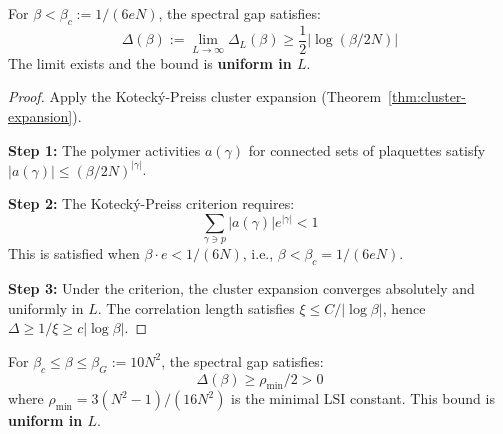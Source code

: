 \begin{theorem}
\label{thm:strong-gap-rigorous}
For $\beta < \beta_c := 1/(6eN)$, the spectral gap satisfies:
\[
\Delta(\beta) := \lim_{L \to \infty} \Delta_L(\beta) \geq \frac{1}{2}|\log(\beta/2N)|
\]
The limit exists and the bound is \textbf{uniform in $L$}.
\end{theorem}

\begin{proof}
Apply the Koteck\'y-Preiss cluster expansion (Theorem~\ref{thm:cluster-expansion}).

\textbf{Step 1:} The polymer activities $a(\gamma)$ for connected sets of 
plaquettes satisfy $|a(\gamma)| \leq (\beta/2N)^{|\gamma|}$.

\textbf{Step 2:} The Koteck\'y-Preiss criterion requires:
\[
\sum_{\gamma \ni p} |a(\gamma)| e^{|\gamma|} < 1
\]
This is satisfied when $\beta \cdot e < 1/(6N)$, i.e., $\beta < \beta_c = 1/(6eN)$.

\textbf{Step 3:} Under the criterion, the cluster expansion converges absolutely 
and uniformly in $L$. The correlation length satisfies $\xi \leq C/|\log\beta|$, 
hence $\Delta \geq 1/\xi \geq c|\log\beta|$.
\end{proof}

\begin{theorem}
\label{thm:intermediate-gap-rigorous}
For $\beta_c \leq \beta \leq \beta_G := 10N^2$, the spectral gap satisfies:
\[
\Delta(\beta) \geq \rho_{\min}/2 > 0
\]
where $\rho_{\min} = 3(N^2-1)/(16N^2)$ is the minimal LSI constant. This bound 
is \textbf{uniform in $L$}.
\end{theorem}

